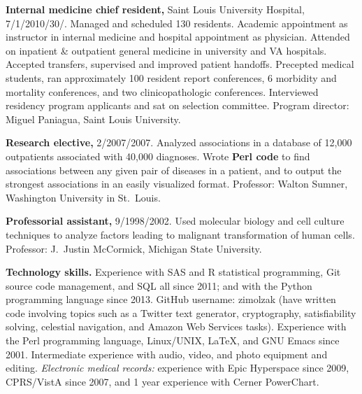 \documentclass[10pt]{article}
\begin{document}
\textbf{Internal medicine chief resident,} Saint Louis University
Hospital, 7/1/2010\ndash{}/30/. Managed
and scheduled 130 residents. Academic appointment as instructor in
internal medicine and hospital appointment as physician. Attended on
inpatient \& outpatient general medicine in university and VA
hospitals. Accepted transfers, supervised and improved patient
handoffs. Precepted medical students, ran approximately 100 resident
report conferences, 6 morbidity and mortality conferences, and two
clinicopathologic conferences. Interviewed residency program
applicants and sat on selection committee. Program director: Miguel
Paniagua, Saint Louis University.

\textbf{Research elective,} 2/2007/2007. Analyzed associations
in a database of 12,000 outpatients associated with 40,000 diagnoses.
Wrote \textbf{Perl code} to find associations between any given pair of
diseases in a patient, and to output the strongest associations in an
easily visualized format. Professor: Walton Sumner, Washington
University in St.\ Louis.

\textbf{Professorial assistant,} 9/1998/2002. Used molecular
biology and cell culture techniques to analyze factors leading to
malignant transformation of human cells. Professor: J.\ Justin
McCormick, Michigan State University.

\textbf{Technology skills.} Experience with SAS and R statistical
programming, Git source code management, and SQL all since 2011; and
with the Python programming language since 2013. GitHub username:
zimolzak (have written code involving topics such as a Twitter text
generator, cryptography, satisfiability solving, celestial navigation,
and Amazon Web Services tasks). Experience with the Perl programming
language, Linux/UNIX, \LaTeX, and GNU Emacs since 2001. Intermediate
experience with audio, video, and photo equipment and
editing. \emph{Electronic medical records:} experience with Epic
Hyperspace since 2009, CPRS/VistA since 2007, and 1 year experience
with Cerner PowerChart.
\end{document}
